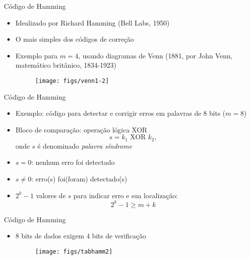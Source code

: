 \begin{slide}{Código de Hamming}
\begin{itemize}
   \item Idealizado por Richard Hamming (Bell Labs, 1950)
   \item O mais simples dos códigos de correção
   \item Exemplo para $m=4$, usando diagramas de Venn (1881, por John Venn, matemático britânico, 1834-1923)\\
   \begin{figure}[h]
      \centering
      \texttt{[image: figs/venn1-2]}
   \end{figure}
\end{itemize}
\end{slide}

\begin{slide}{Código de Hamming}
\begin{itemize}
   \item Exemplo: código para detectar e corrigir erros em palavras de 8 bits ($m=8$)\pause
   \item Bloco de comparação: operação lógica XOR
   \begin{equation*}
       s = k_1 \text{ XOR } k_2,
   \end{equation*}
   onde $s$ é denominado \emph{palavra síndrome}\pause
   \item $s = 0$: nenhum erro foi detectado\pause
   \item $s \neq 0$: erro(s) foi(foram) detectado(s)\pause
   \item $2^k -1$ valores de $s$ para indicar erro e sua localização:
   \begin{equation*}
      2^k -1 \geq m+k
   \end{equation*}
\end{itemize}
\end{slide}

\begin{slide}{Código de Hamming}
\begin{itemize}
   \item 8 bits de dados exigem 4 bits de verificação
   \begin{figure}[h]
      \centering
      \texttt{[image: figs/tabhamm2]}
   \end{figure}
\end{itemize}
\end{slide}

